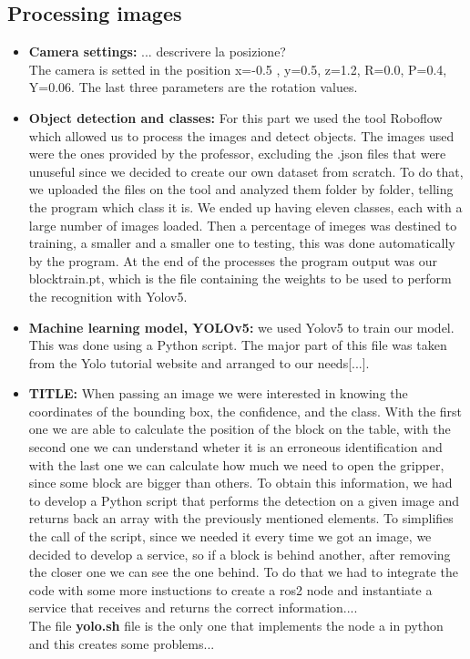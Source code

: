 \documentclass[12pt,a4paper]{article}
\begin{document}
\subsection{Processing images}\label{subsec:imageproc}
\begin{itemize}
    \item \textbf{Camera settings:} ... descrivere la posizione?\\
    The camera is setted in the position x=-0.5 , y=0.5, z=1.2, R=0.0, P=0.4, Y=0.06. The last three parameters are the rotation values.
    \item \textbf{Object detection and classes:} For this part we used the tool Roboflow which allowed us to process the images and detect objects. The images used were the ones provided by the professor, excluding the .json files that were unuseful since we decided to create our own dataset from scratch. To do that, we uploaded the files on the tool and analyzed them folder by folder, telling the program which class it is. We ended up having eleven classes, each with a large number of images loaded. Then a percentage of imeges was destined to training, a smaller and a smaller one to testing, this was done automatically by the program. At the end of the processes the program output was our blocktrain.pt, which is the file containing the weights to be used to perform the recognition with Yolov5.
    \item \textbf{Machine learning model, YOLOv5:} we used Yolov5 to train our model. This was done using a Python script. The major part of this file was taken from the Yolo tutorial website and arranged to our needs[...]. 
    \item \textbf{TITLE:} When passing an image we were interested in knowing the coordinates of the bounding box, the confidence, and the class. With the first one we are able to calculate the position of the block on the table, with the second one we can understand wheter it is an erroneous identification and with the last one we can calculate how much we need to open the gripper, since some block are bigger than others. To obtain this information, we had to develop a Python script that performs the detection on a given image and returns back an array with the previously mentioned elements. To simplifies the call of the script, since we needed it every time we got an image, we decided to develop a service, so if a block is behind another, after removing the closer one we can see the one behind. To do that we had to integrate the code with some more instuctions to create a ros2 node and instantiate a service that receives and returns the correct information....\\
    The file \textbf{yolo.sh} file is the only one that implements the node a in python and this creates some problems...
\end{itemize}
\end{document}
